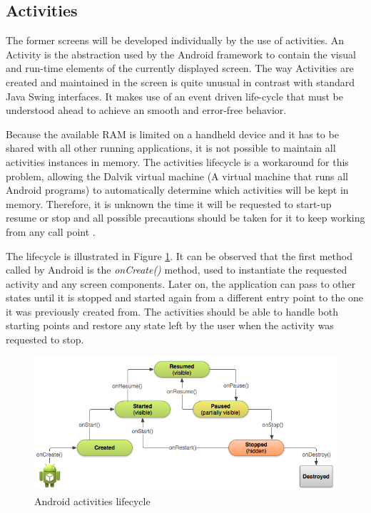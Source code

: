 \subsection{Activities}
The former screens will be developed individually by the use of activities. An Activity is the abstraction used by the Android framework to contain the visual and run-time elements of the currently displayed screen. The way Activities are created and maintained in the screen is quite unusual in contrast with standard Java Swing interfaces. It makes use of an event driven life-cycle that must be understood ahead to achieve an smooth and error-free behavior. 

Because the available RAM is limited on a handheld device and it has to be shared with all other running applications, it is not possible to maintain  all activities instances in memory. The activities lifecycle is a workaround for this problem, allowing the Dalvik virtual machine (A virtual machine that runs all Android programs) to automatically determine which activities will be kept in memory. Therefore, it is unknown the time it will be requested to start-up resume or stop and all possible precautions should be taken for it to keep working from any call point .

The lifecycle is illustrated in Figure \ref{fig:activities_lifecycle}. It can be observed that the first method called by Android is the \textit{onCreate()} method, used to instantiate the requested activity and any screen components. Later on, the application can pass to other states until it is stopped and started again from a different entry point to the one it was previously created from. The activities should be able to handle both starting points and restore any state left by the user when the activity was requested to stop. 

\begin{figure}[H]
\begin{adjustbox}{width=1\textwidth,center=\textwidth}
  \centering
  \includegraphics[scale=1]{images/basic-lifecycle.png}
\end{adjustbox}
  \caption[Android activities lifecycle]{Android activities lifecycle\footnotemark}
  \label{fig:activities_lifecycle}
\end{figure}

